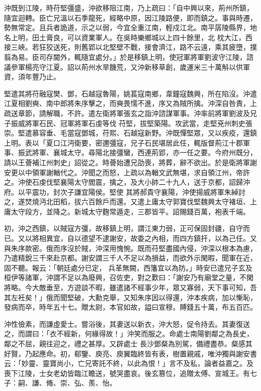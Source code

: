 \begin{pinyinscope}
 沖既到江陵，時苻堅彊盛，沖欲移阻江南，乃上疏曰：「自中興以來，荊州所鎮，隨宜迴轉。臣亡兄溫以石季龍死，經略中原，因江陵路便，即而鎮之。事與時遷，勢無常定。且兵者詭道，示之以弱，今宜全重江南，輕戍江北。南平孱陵縣界，地名上明，田土膏良，可以資業軍人。在吳時樂鄉城以上四十餘里，北
 枕大江，西接三峽。若狂狡送死，則舊郢以北堅壁不戰，接會濟江，路不云遠，乘其疲墮，撲翦為易。臣司存閫外，輒隨宜處分。」於是移鎮上明，使冠軍將軍劉波守江陵，諮議參軍楊亮守江夏。詔以荊州水旱饑荒，又沖新移草創，歲運米三十萬斛以供軍資，須年豐乃止。



 堅遣其將苻融寇樊、鄧，石越寇魯陽，姚萇寇南鄉，韋鐘寇魏興，所在陷沒。沖遣江夏相劉奭、南中郎將朱序擊之，而奭畏懦不進，序又為賊所擒。沖深自咎責，上疏送章節，請解職，不許。遣左衛將軍張玄之詣沖諮謀軍事。沖率前將軍劉波及兄子振威將軍石民、冠軍將軍石虔等伐
 苻堅，拔堅築陽。攻武當，走堅兗州刺史張崇。堅遣慕容垂、毛當寇鄧城，苻熙、石越寇新野。沖既憚堅眾，又以疾疫，還鎮上明。表以「夏口江沔衛要，密邇彊寇，兄子石民堪居此任，輒版督荊江十郡軍事、振武將軍、襄城太守。尋陽北接彊蠻，西連荊郢，亦一任之要。今府州既分，請以王薈補江州刺史」詔從之。時薈始遭兄劭喪，將葬，辭不欲出。於是衛將軍謝安更以中領軍謝輶代之。沖聞之而怒，上疏以為輶文武無堪，求自領江州，帝許之。沖使石虔伐堅襄陽太守閻震，擒之，及大小帥二十九人，送于京都，詔歸沖府。以平震功，封次子謙宜陽侯。堅使
 其將郝貴守襄陽，沖使揚威將軍朱綽討之，遂焚燒沔北田稻，拔六百餘戶而還。又遣上庸太守郭寶伐堅魏興太守褚垣、上庸太守段方，並降之。新城太守麴常遁走，三郡皆平。詔賜錢百萬，袍表千端。



 初，沖之西鎮，以賊寇方彊，故移鎮上明，謂江東力弱，正可保固封疆，自守而已。又以將相異宜，自以德望不逮謝安，故委之內相，而四方鎮扞，以為己任。又與朱序款密。俄而序沒於賊，沖深用愧惋。既而苻堅盡國內侵，沖深以根本為慮，乃遣精銳三千來赴京都。謝安謂三千人不足以為損益，而欲外示閑暇，聞軍在近，固不聽。報云：「朝廷處分已定，
 兵革無闕，西籓宜以為防。」時安已遣兄子玄及桓伊等諸軍，沖謂不足以為廢興，召佐吏，對之歎曰：「謝安乃有廟堂之量，不閑將略。今大敵垂至，方遊談不暇，雖遣諸不經事少年，眾又寡弱，天下事可知，吾其左衽矣！」俄而聞堅破，大勳克舉，又知朱序因以得還，沖本疾病，加以慚恥，發病而卒，時年五十七。贈太尉，本官如故，謚曰宣穆。賻錢五十萬，布五百匹。



 沖性儉素，而謙虛愛士。嘗浴後，其妻送以新衣，沖大怒，促令持去。其妻復送之，而謂曰：「衣不經新，何緣得故！」沖笑而服之。命處士南陽劉鄰之為長史，鄰之不屈，親往迎之，禮之甚厚。又辟處士
 長沙鄧粲為別駕，備禮盡恭。粲感其好賢，乃起應命。初，郗鑒、庾亮、庾翼臨終皆有表，樹置親戚，唯沖獨與謝安書云：「妙靈、靈寶尚小，亡兄寄託不終，以此為恨！」言不及私，論者益嘉之。及喪下江陵，士女老幼皆臨江瞻送，號哭盡哀。後玄篡位，追贈太傅、宣城王。有七子：嗣、謙、脩、崇、弘、羨、怡。




\end{pinyinscope}
